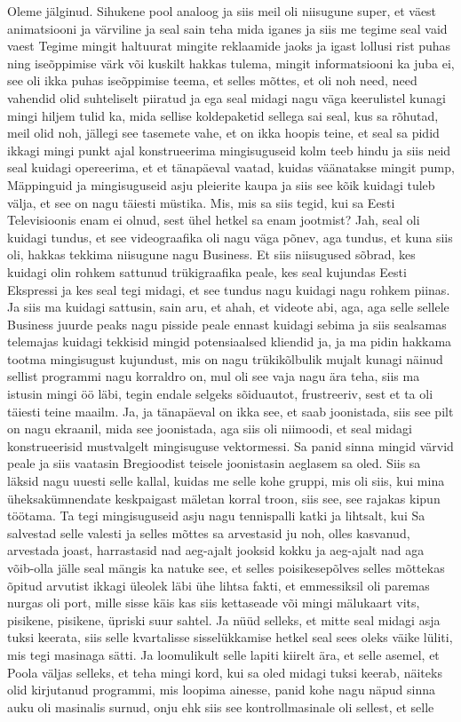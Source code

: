Oleme jälginud.
Sihukene pool analoog ja siis meil oli niisugune super, et väest animatsiooni ja värviline ja seal sain teha mida iganes ja siis me tegime seal vaid vaest Tegime mingit haltuurat mingite reklaamide jaoks ja igast lollusi rist puhas ning iseõppimise värk või kuskilt hakkas tulema, mingit informatsiooni ka juba ei, see oli ikka puhas iseõppimise teema, et selles mõttes, et oli noh need, need vahendid olid suhteliselt piiratud ja ega seal midagi nagu väga keerulistel kunagi mingi hiljem tulid ka, mida sellise koldepaketid sellega sai seal, kus sa rõhutad, meil olid noh, jällegi see tasemete vahe, et on ikka hoopis teine, et seal sa pidid ikkagi mingi punkt ajal konstrueerima mingisuguseid kolm teeb hindu ja siis neid seal kuidagi opereerima, et et tänapäeval vaatad, kuidas väänatakse mingit pump, Mäppinguid ja mingisuguseid asju pleierite kaupa ja siis see kõik kuidagi tuleb välja, et see on nagu täiesti müstika. Mis, mis sa siis tegid, kui sa Eesti Televisioonis enam ei olnud, sest ühel hetkel sa enam jootmist? Jah, seal oli kuidagi tundus, et see videograafika oli nagu väga põnev, aga tundus, et kuna siis oli, hakkas tekkima niisugune nagu Business. Et siis niisugused sõbrad, kes kuidagi olin rohkem sattunud trükigraafika peale, kes seal kujundas Eesti Ekspressi ja kes seal tegi midagi, et see tundus nagu kuidagi nagu rohkem piinas. Ja siis ma kuidagi sattusin, sain aru, et ahah, et videote abi, aga, aga selle sellele Business juurde peaks nagu pisside peale ennast kuidagi sebima ja siis sealsamas telemajas kuidagi tekkisid mingid potensiaalsed kliendid ja, ja ma pidin hakkama tootma mingisugust kujundust, mis on nagu trükikõlbulik mujalt kunagi näinud sellist programmi nagu korraldro on, mul oli see vaja nagu ära teha, siis ma istusin mingi öö läbi, tegin endale selgeks sõiduautot, frustreeriv, sest et ta oli täiesti teine maailm. Ja, ja tänapäeval on ikka see, et saab joonistada, siis see pilt on nagu ekraanil, mida see joonistada, aga siis oli niimoodi, et seal midagi konstrueerisid mustvalgelt mingisuguse vektormessi. Sa panid sinna mingid värvid peale ja siis vaatasin Bregioodist teisele joonistasin aeglasem sa oled. Siis sa läksid nagu uuesti selle kallal, kuidas me selle kohe gruppi, mis oli siis, kui mina üheksakümnendate keskpaigast mäletan korral troon, siis see, see rajakas kipun töötama. Ta tegi mingisuguseid asju nagu tennispalli katki ja lihtsalt, kui Sa salvestad selle valesti ja selles mõttes sa arvestasid ju noh, olles kasvanud, arvestada joast, harrastasid nad aeg-ajalt jooksid kokku ja aeg-ajalt nad aga võib-olla jälle seal mängis ka natuke see, et selles poisikesepõlves selles mõttekas õpitud arvutist ikkagi üleolek läbi ühe lihtsa fakti, et emmessiksil oli paremas nurgas oli port, mille sisse käis kas siis kettaseade või mingi mälukaart vits, pisikene, pisikene, üpriski suur sahtel. Ja nüüd selleks, et mitte seal midagi asja tuksi keerata, siis selle kvartalisse sisselükkamise hetkel seal sees oleks väike lüliti, mis tegi masinaga sätti. Ja loomulikult selle lapiti kiirelt ära, et selle asemel, et Poola väljas selleks, et teha mingi kord, kui sa oled midagi tuksi keerab, näiteks olid kirjutanud programmi, mis loopima ainesse, panid kohe nagu näpud sinna auku oli masinalis surnud, onju ehk siis see kontrollmasinale oli sellest, et selle 